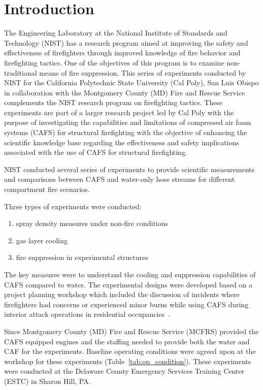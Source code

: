 \documentclass[12pt,oneside]{book}
\begin{document}
\chapter{Introduction}
\label{chap:Introduction}
\setcounter{page}{1}

The Engineering Laboratory at the National Institute of Standards and Technology (NIST) has a research program aimed at improving the safety and effectiveness of firefighters through improved knowledge of fire behavior and firefighting tactics. One of the objectives of this program is to examine non-traditional means of fire suppression. This series of experiments conducted by NIST for the California Polytechnic State University (Cal Poly), San Luis Obispo in collaboration with the Montgomery County (MD) Fire and Rescue Service complements the NIST research program on firefighting tactics. These experiments are part of a larger research project led by Cal Poly with the purpose of investigating the capabilities and limitations of compressed air foam systems (CAFS) for structural firefighting with the objective of enhancing the scientific knowledge base regarding the effectiveness and safety implications associated with the use of CAFS for structural firefighting.

NIST conducted several series of experiments to provide scientific measurements and comparisons between CAFS and water-only hose streams for different compartment fire scenarios.

Three types of experiments were conducted:
\begin{enumerate}
\item spray density measures under non-fire conditions
\item gas layer cooling
\item fire suppression in experimental structures
\end{enumerate}

The key measures were to understand the cooling and suppression capabilities of CAFS compared to water. The experimental designs were developed based on a project planning workshop which included the discussion of incidents where firefighters had concerns or experienced minor burns while using CAFS during interior attack operations in residential occupancies~\cite{Grant:2011}.

Since Montgomery County (MD) Fire and Rescue Service (MCFRS) provided the CAFS equipped engines and the staffing needed to provide both the water and CAF for the experiments. Baseline operating conditions were agreed upon at the workshop for these experiments (Table~\ref{tab:op_condition}). These experiments were conducted at the Delaware County Emergency Services Training Center (ESTC) in Sharon Hill, PA.
\end{document}

